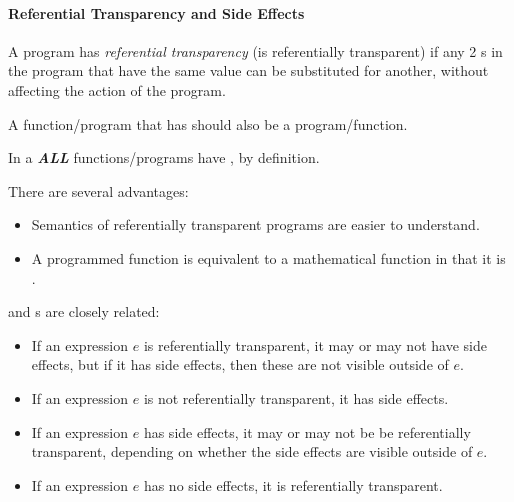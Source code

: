 \paragraph{Referential Transparency and Side Effects}\label{par:Operand_Evaluation-Referential_Transparency_Side_Effects}
\begin{definition}\label{def:Referential_Transparency}
  A program has \emph{referential transparency} (is referentially transparent) if any 2 s in the program that have the same value can be substituted for another, without affecting the action of the program.

  \begin{remark}
    A function/program that has  should also be a  program/function.
  \end{remark}

  \begin{remark}
    In a  \textbf{\emph{ALL}} functions/programs have , by definition.
  \end{remark}
\end{definition}

There are several advantages:
\begin{itemize}[noitemsep]
\item Semantics of referentially transparent programs are easier to understand.
\item A programmed function is equivalent to a mathematical function in that it is .
\end{itemize}

 and s are closely related:
\begin{itemize}[noitemsep]
\item If an expression $e$ is referentially transparent, it may or may not have side effects, but if it has side effects, then these are not visible outside of $e$.
\item If an expression $e$ is not referentially transparent, it has side effects.
\item If an expression $e$ has side effects, it may or may not be be referentially transparent, depending on whether the side effects are visible outside of $e$.
\item If an expression $e$ has no side effects, it is referentially transparent.
\end{itemize}

